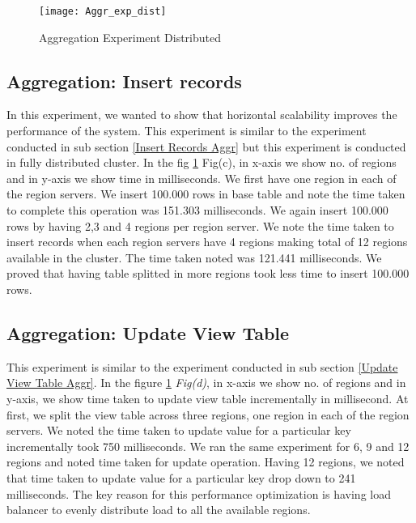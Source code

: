 \documentclass[11pt,a4paper,bibtotoc,idxtotoc,headsepline,footsepline,footexclude,BCOR12mm,DIV13]{scrbook}
\begin{document}
\begin{figure}
	\centering
	\texttt{[image: Aggr\_exp\_dist]}
	\caption{Aggregation Experiment Distributed}
	\label{sec:AggrExpDist}
	
\end{figure} 


\subsection{Aggregation: Insert records}
\label{Insert Records Aggr Dist}

In this experiment, we wanted to show that horizontal scalability improves the performance of the system. This experiment is similar to the experiment conducted in sub section \ref{Insert Records Aggr} but this experiment is conducted in fully distributed cluster. In the fig \ref{sec:AggrExpDist} Fig(c), in x-axis we show no. of regions and in y-axis we show time in milliseconds. We first have one region in each of the region servers. We insert 100.000 rows in base table and note the time taken to complete this operation was 151.303 milliseconds. We again insert 100.000 rows by having 2,3 and 4 regions per region server. We note the time taken to insert records when each region servers have 4 regions making total of 12 regions available in the cluster. The time taken noted was 121.441 milliseconds. We proved that having table splitted in more regions took less time to insert 100.000 rows.

\subsection{Aggregation: Update View Table} 
\label{Update View Table Aggr Dist}

This experiment is similar to the experiment conducted in sub section \ref{Update View Table Aggr}. In the figure \ref{sec:AggrExpDist} \emph{Fig(d)}, in x-axis we show no. of regions and in y-axis, we show time taken to update view table incrementally in millisecond. At first, we split the view table across three regions, one region in each of the region servers. We noted the time taken to update value for a particular key incrementally took 750 milliseconds. We ran the same experiment for 6, 9 and 12 regions and noted time taken for update operation. Having 12 regions, we noted that time taken to update value for a particular key drop down to 241 milliseconds. The key reason for this performance optimization is having load balancer to evenly distribute load to all the available regions. 
\end{document}
